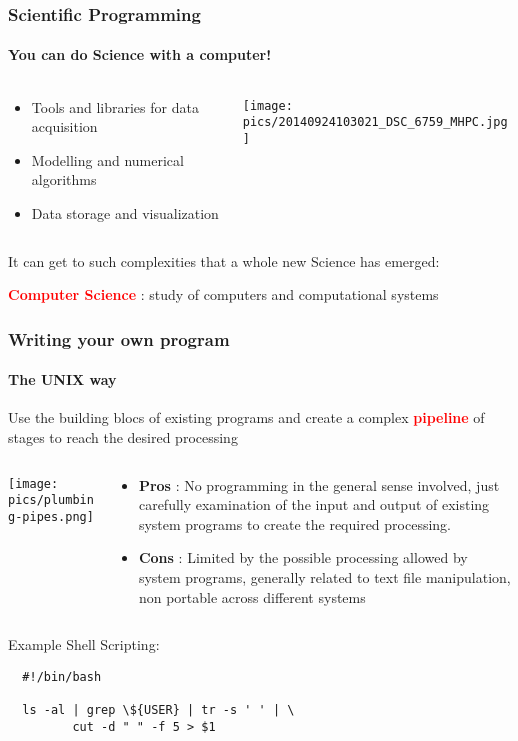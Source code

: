 \documentclass[unknownkeysallowed, 10pt, a4 paper, handout]{beamer}
\newcommand{\focus}[1]{\textbf{\textcolor{red}{#1}}}
\begin{document}
\begin{frame}[label=science]
  \frametitle{Scientific Programming}
  \framesubtitle{You can do Science with a computer!}
  \begin{columns}[T]
    \begin{column}{.53\textwidth}
      \begin{block}{}
        \begin{itemize}
          \item Tools and libraries for data acquisition
          \item Modelling and numerical algorithms
          \item Data storage and visualization
        \end{itemize}
      \end{block}
    \end{column}
    \hfill
    \begin{column}{.45\textwidth}
      \vspace{15pt}
      \texttt{[image: pics/20140924103021\_DSC\_6759\_MHPC.jpg]}
    \end{column}
  \end{columns}
  It can get to such complexities that a whole new Science has emerged:
  \begin{center}
    \focus{Computer Science} :
             study of computers and computational systems
  \end{center}
\end{frame}


\begin{frame}[label=pipelining, fragile=singleslide]
  \frametitle{Writing your own program}
  \framesubtitle{The UNIX way}
  Use the building blocs of existing programs and create a complex
  \focus{pipeline} of stages to reach the desired processing
  \begin{columns}[T]
    \begin{column}{.33\textwidth}
      \vspace{20pt}
      \texttt{[image: pics/plumbing-pipes.png]}
    \end{column}
    \hfill
    \begin{column}{.66\textwidth}
      \begin{itemize}
        \item \textbf{Pros} : No programming in the general sense involved,
          just carefully examination of the input and output of existing
          system programs to create the required processing.
        \item \textbf{Cons} : Limited by the possible processing allowed by
          system programs, generally related to text file manipulation,
          non portable across different systems
      \end{itemize}
    \end{column}
  \end{columns}
  Example Shell Scripting:
  \begin{verbatim}
  #!/bin/bash

  ls -al | grep \${USER} | tr -s ' ' | \
         cut -d " " -f 5 > $1
  \end{verbatim}
\end{frame}
\end{document}
